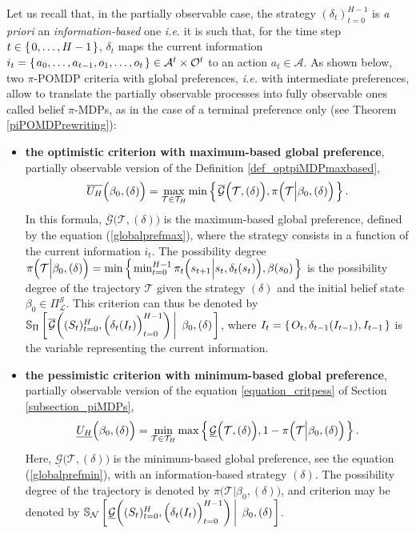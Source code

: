 Let us recall that, in the partially observable case, 
the strategy $(\delta_t)_{t=0}^{H-1}$ 
is \textit{a priori} an \textit{information-based} one
\textit{i.e.} it is such that, for the time step $t \in \left\{ \left. 0,\ldots,H-1 \right. \right\}$, 
$\delta_t$ maps the current information 
$i_t = \left\{ \left.  a_0,\ldots,a_{t-1}, o_1, \ldots,o_t  \right. \right\}
\in \mathcal{A}^t \times \mathcal{O}^t$
to an action $a_t \in \mathcal{A}$.
As shown below, two $\pi$-POMDP criteria with global preferences,
\textit{i.e.} with intermediate preferences, 
allow to translate the partially observable processes 
into fully observable ones called belief $\pi$-MDPs,
as in the case of a terminal preference only (see Theorem \ref{piPOMDPrewriting}):
\begin{itemize}
\item \textbf{the optimistic criterion with maximum-based global preference}, partially observable version of the Definition \ref{def_optpiMDPmaxbased},
\begin{equation}
\label{optmaxpiPOMDPcrit}
\overline{U_H}\Big(\beta_0,(\delta)\Big) = \max_{\mathcal{T} \in \mathcal{T}_H} \min \left\{ \left.  \overline{\mathcal{G}} \Big(\mathcal{T},(\delta)\Big), \pi \Big( \mathcal{T} \Big\vert \beta_0, (\delta) \Big)  \right. \right\}.
\end{equation}
In this formula, $\overline{\mathcal{G}}\Big(\mathcal{T},(\delta)\Big)$
is the maximum-based global preference, defined by the equation (\ref{globalprefmax}),
where the strategy consists in a function of the current information $i_t$.
The possibility degree $\pi \Big( \mathcal{T} \Big\vert \beta_0, (\delta) \Big) = \min \left\{ \left.  \min_{t=0}^{H-1} \pi_t \Big( s_{t+1} \Big\vert s_t, \delta_t(s_t) \Big), \beta(s_0)  \right. \right\}$ 
is the possibility degree of the trajectory $\mathcal{T}$
given the strategy $(\delta)$ and the initial belief state $\beta_0 \in \Pi^{\mathcal{S}}_{\mathcal{L}}$.
This criterion can thus be denoted by $\mathbb{S}_{\Pi} \left[ \left.   \overline{\mathcal{G}} \bigg( (S_t)_{t=0}^{H}, \Big(\delta_t(I_t)\Big)_{t=0}^{H-1} \bigg) \, \right| \left. \, \beta_0, (\delta)  \right. \right]$,
where $I_t = \left\{ \left.  O_t, \delta_{t-1}(I_{t-1}), I_{t-1} \right. \right\}$ 
is the variable representing the current information.
\item \textbf{the pessimistic criterion with minimum-based global preference}, partially observable version of the equation \ref{equation_critpess} of Section \ref{subsection_piMDPs},
\begin{equation}
\label{pessminpiPOMDPcrit} 
\underline{U_H}\Big(\beta_0,(\delta)\Big) = \min_{\mathcal{T} \in \mathcal{T}_H} \max \left\{ \left.  \underline{\mathcal{G}} \Big(\mathcal{T},(\delta)\Big), 1 - \pi \Big( \mathcal{T} \Big\vert \beta_0, (\delta) \Big)  \right. \right\}.
\end{equation}
Here, $\underline{\mathcal{G}}\Big(\mathcal{T},(\delta)\Big)$
is the minimum-based global preference, see the equation (\ref{globalprefmin}),
with an information-based strategy $(\delta)$.
The possibility degree of the trajectory is denoted by 
$\pi \Big( \mathcal{T} \Big\vert \beta_0, (\delta) \Big)$,
and criterion may be denoted by 
$\mathbb{S}_{\mathcal{N}} \left[ \left.   \underline{\mathcal{G}} \bigg( (S_t)_{t=0}^{H}, \Big(\delta_t(I_t)\Big)_{t=0}^{H-1} \bigg) \, \right| \left. \, \beta_0, (\delta)  \right. \right]$.
\end{itemize}

